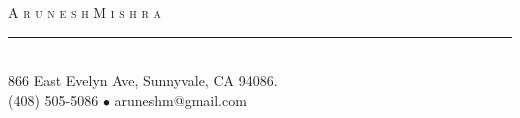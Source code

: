 
\setlength{\topmargin}{-0.6in}  %
\setlength{\textheight}{9.3in}  %
\addtolength{\textwidth}{-0.1in}  %
\setlength{\headrulewidth}{0pt} %
\setlength{\headsep}{0.2in}     %
\setlength{\headheight}{12pt}   %

\newdimen\mylinewidth 
\setlength{\mylinewidth}{\resumewidth}
\addtolength{\mylinewidth}{-0.4in}

\def\bull{\vrule height 0.8ex width .7ex depth -.1ex }
\newcommand{\lineunder}{\vspace*{-8pt} \\ \hspace*{-18pt} \rule{\mylinewidth}{0.5pt} \\}
\newcommand{\justline}{\hspace*{-18pt} \hrulefill \\\vspace{4pt}}
\newcommand{\header}[1]{{\hspace*{-15pt}\vspace*{2pt} \large{\textsc{#1}}} \vspace*{-2pt} \lineunder}
\newcommand{\contact}[3]{
\vspace*{-8pt}
\begin{center}
{\LARGE \scshape {#1}}
\lineunder
#2\\
#3
\end{center}
\vspace*{-8pt}
}

\lhead{\hspace*{-\sectionwidth}} %
\cfoot{}  %
\pagestyle{fancy} %
 
\contact{A r u n e s h \hspace{3mm}    M i s h r a}
{  866 East Evelyn Ave, Sunnyvale, CA 94086.}
{(408) 505-5086 $\bullet$ aruneshm@gmail.com}
\thispagestyle{empty} %

